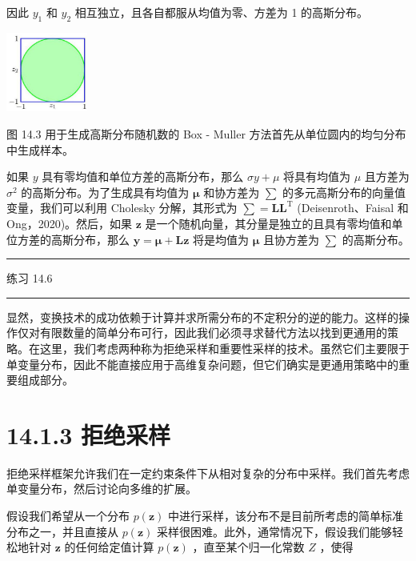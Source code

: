 \documentclass[10pt]{report}
\newcommand{\HRule}{\begin{center}\rule{0.9\linewidth}{0.2mm}\end{center}}
\begin{document}
因此 \({y}_{1}\) 和 \({y}_{2}\) 相互独立，且各自都服从均值为零、方差为 1 的高斯分布。

\begin{center}
\includegraphics[max width=0.2\textwidth]{images/0194e279-9b28-703a-88f4-c3ac21e2010d_452_1222_344_326_319_0.jpg}
\end{center}
\hspace*{3em} 

图 14.3 用于生成高斯分布随机数的 Box - Muller 方法首先从单位圆内的均匀分布中生成样本。

如果 \(y\) 具有零均值和单位方差的高斯分布，那么 \({\sigma y} + \mu\) 将具有均值为 \(\mu\) 且方差为 \({\sigma }^{2}\) 的高斯分布。为了生成具有均值为 \(\mathbf{\mu }\) 和协方差为 \(\mathbf{\sum }\) 的多元高斯分布的向量值变量，我们可以利用 Cholesky 分解，其形式为 \(\mathbf{\sum } = {\mathbf{{LL}}}^{\mathrm{T}}\) (Deisenroth、Faisal 和 Ong，2020)。然后，如果 \(\mathbf{z}\) 是一个随机向量，其分量是独立的且具有零均值和单位方差的高斯分布，那么 \(\mathbf{y} = \mathbf{\mu } + \mathbf{{Lz}}\) 将是均值为 \(\mathbf{\mu }\) 且协方差为 \(\mathbf{\sum }\) 的高斯分布。

\HRule

练习 14.6

\HRule

显然，变换技术的成功依赖于计算并求所需分布的不定积分的逆的能力。这样的操作仅对有限数量的简单分布可行，因此我们必须寻求替代方法以找到更通用的策略。在这里，我们考虑两种称为拒绝采样和重要性采样的技术。虽然它们主要限于单变量分布，因此不能直接应用于高维复杂问题，但它们确实是更通用策略中的重要组成部分。

\section*{14.1.3 拒绝采样}

拒绝采样框架允许我们在一定约束条件下从相对复杂的分布中采样。我们首先考虑单变量分布，然后讨论向多维的扩展。

假设我们希望从一个分布 \(p\left( \mathbf{z}\right)\) 中进行采样，该分布不是目前所考虑的简单标准分布之一，并且直接从 \(p\left( \mathbf{z}\right)\) 采样很困难。此外，通常情况下，假设我们能够轻松地针对 \(\mathbf{z}\) 的任何给定值计算 \(p\left( \mathbf{z}\right)\) ，直至某个归一化常数 \(Z\) ，使得
\end{document}
